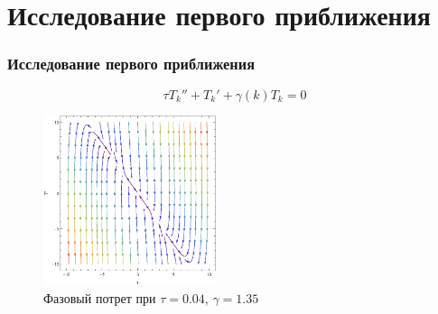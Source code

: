 \documentclass{beamer}
\numberwithin{equation}{section}
\begin{document}
    \section{Исследование первого приближения}
    \begin{frame}
        \frametitle{Исследование первого приближения}

        \begin{equation}
            \tau {T_k}'' + {T_k}' + \gamma(k) T_k = 0
        \end{equation}

        \begin{figure}
            \begin{center}
                \includegraphics[width=0.45\textwidth]{phasePortrait-0-04-1-35.eps}
            \end{center}
            \caption{Фазовый потрет при $\tau = 0.04$, $\gamma = 1.35$}
        \end{figure}

    \end{frame}
\end{document}
